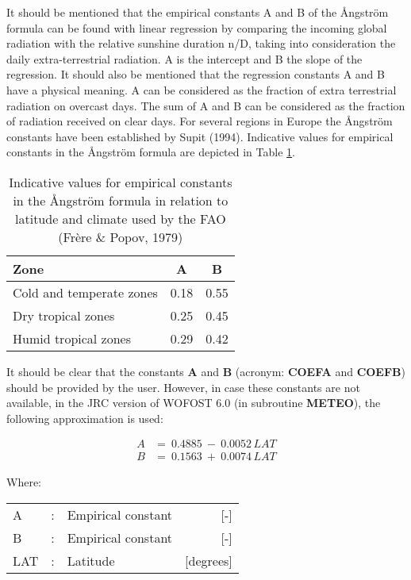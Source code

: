 It should be mentioned that the empirical constants A and B of the \AA ngstr\"{o}m formula 
can be found with linear regression by comparing the incoming global radiation with the
relative sunshine duration n/D, taking into consideration the daily extra-terrestrial
radiation. A is the intercept and B the slope of the regression. It should also be mentioned
that the regression constants A and B have a physical meaning. A can be considered as
the fraction of extra terrestrial radiation on overcast days. The sum of A and B can be
considered as the fraction of radiation received on clear days.
For several regions in Europe the \AA ngstr\"{o}m constants have been established by Supit
(1994). Indicative values for empirical constants in the \AA ngstr\"{o}m formula are 
depicted in Table \ref{tab:angstAB}.

\begin{table}
	\centering
	\caption{Indicative values for empirical constants in the \AA ngstr\"{o}m formula in
		relation to latitude and climate used by the FAO (Fr\`{e}re \& Popov, 1979)}
	\label{tab:angstAB}
	\begin{tabular}{lcc}
		\hline
		Zone &   A &  B  \\
		\hline
		Cold and temperate zones   &  0.18 &  0.55\\
		Dry tropical zones  &   0.25  & 0.45\\
		Humid tropical zones  &   0.29 &  0.42\\
		\hline
	\end{tabular}
\end{table}

It should be clear that the constants {\bf A} and {\bf B} (acronym: {\bf COEFA} and {\bf COEFB}) should be
provided by the user. However, in case these constants are not available, in the JRC
version of WOFOST 6.0 (in subroutine {\bf METEO}), the following approximation is used:

\begin{align*}
A &=~0.4885~-~0.0052 \, LAT \\
B &=~0.1563~+~0.0074 \, LAT 
\end{align*}

Where:\\[5pt]
\begin{tabularx}{\textwidth}{llXr}
	A &:& Empirical constant  & [-]\\
	B &:& Empirical constant  & [-]\\
	LAT &:& Latitude  & [degrees]\\
\end{tabularx}

